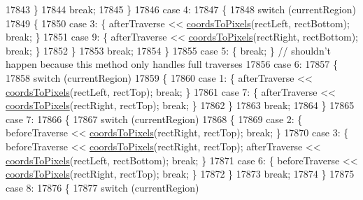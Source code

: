 \begin{DoxyCode}
17843       \}
17844       \textcolor{keywordflow}{break};
17845     \}
17846     \textcolor{keywordflow}{case} 4:
17847     \{
17848       \textcolor{keywordflow}{switch} (currentRegion)
17849       \{
17850         \textcolor{keywordflow}{case} 3: \{ afterTraverse << \hyperlink{class_q_c_p_abstract_plottable_ade710a776104b14c1c835168ce1bfc5c}{coordsToPixels}(rectLeft, rectBottom); \textcolor{keywordflow}{break}; \}
17851         \textcolor{keywordflow}{case} 9: \{ afterTraverse << \hyperlink{class_q_c_p_abstract_plottable_ade710a776104b14c1c835168ce1bfc5c}{coordsToPixels}(rectRight, rectBottom); \textcolor{keywordflow}{break}; \}
17852       \}
17853       \textcolor{keywordflow}{break};
17854     \}
17855     \textcolor{keywordflow}{case} 5: \{ \textcolor{keywordflow}{break}; \} \textcolor{comment}{// shouldn't happen because this method only handles full traverses}
17856     \textcolor{keywordflow}{case} 6:
17857     \{
17858       \textcolor{keywordflow}{switch} (currentRegion)
17859       \{
17860         \textcolor{keywordflow}{case} 1: \{ afterTraverse << \hyperlink{class_q_c_p_abstract_plottable_ade710a776104b14c1c835168ce1bfc5c}{coordsToPixels}(rectLeft, rectTop); \textcolor{keywordflow}{break}; \}
17861         \textcolor{keywordflow}{case} 7: \{ afterTraverse << \hyperlink{class_q_c_p_abstract_plottable_ade710a776104b14c1c835168ce1bfc5c}{coordsToPixels}(rectRight, rectTop); \textcolor{keywordflow}{break}; \}
17862       \}
17863       \textcolor{keywordflow}{break};
17864     \}
17865     \textcolor{keywordflow}{case} 7:
17866     \{
17867       \textcolor{keywordflow}{switch} (currentRegion)
17868       \{
17869         \textcolor{keywordflow}{case} 2: \{ beforeTraverse << \hyperlink{class_q_c_p_abstract_plottable_ade710a776104b14c1c835168ce1bfc5c}{coordsToPixels}(rectRight, rectTop); \textcolor{keywordflow}{break}; \}
17870         \textcolor{keywordflow}{case} 3: \{ beforeTraverse << \hyperlink{class_q_c_p_abstract_plottable_ade710a776104b14c1c835168ce1bfc5c}{coordsToPixels}(rectRight, rectTop); afterTraverse << 
      \hyperlink{class_q_c_p_abstract_plottable_ade710a776104b14c1c835168ce1bfc5c}{coordsToPixels}(rectLeft, rectBottom); \textcolor{keywordflow}{break}; \}
17871         \textcolor{keywordflow}{case} 6: \{ beforeTraverse << \hyperlink{class_q_c_p_abstract_plottable_ade710a776104b14c1c835168ce1bfc5c}{coordsToPixels}(rectRight, rectTop); \textcolor{keywordflow}{break}; \}
17872       \}
17873       \textcolor{keywordflow}{break};
17874     \}
17875     \textcolor{keywordflow}{case} 8:
17876     \{
17877       \textcolor{keywordflow}{switch} (currentRegion)

\end{DoxyCode}
